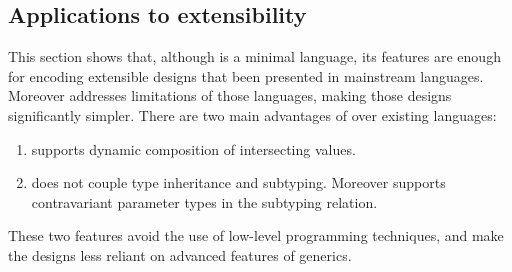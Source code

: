 \subsection{Applications to extensibility} \label{sec:application}



This section shows that, although \name is a minimal language, its
features are enough for encoding extensible designs that been
presented in mainstream languages. Moreover \name addresses
limitations of those languages, making those designs significantly
simpler. There are two main advantages of \name over existing
languages:

\begin{enumerate}
\item \name supports dynamic composition of intersecting values.
\item \name does not couple type inheritance and subtyping. Moreover
  \name supports contravariant parameter types in the subtyping relation.
\end{enumerate}

These two features avoid the use of low-level programming techniques,
and make the designs less reliant on advanced features of generics.

\begin{comment}
Various solutions have been proposed to deal with the extensibility problems and
many rely on heavyweight language features such as abstract methods and classes
in Java. These two features can be used to improve existing designs of modular
programs.

\bruno{I would like to see a story about Church Encodings in
  \name. Can you look at Pierce's papers and try to write something
  along those lines? That will be a good intro for object algebras and
visitors!}


\url{http://repository.cmu.edu/cgi/viewcontent.cgi?article=3018&context=compsci}
Church encoding allows modelling algebraic data types.
\end{comment}





